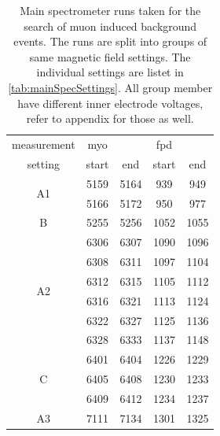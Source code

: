   
  
\begin{table}
	\centering
	\begin{tabular}{|c|cc|cc|}
		\hline
		measurement & myo & & fpd & \\
		setting& start & end & start & end\\
		\hline
		\multirow{2}{*}{A1} & 5159 & 5164 & 939 & 949 \\
		 & 5166 & 5172 & 950 & 977\\
		\hline
		\multirow{1}{*}{B} &5255 & 5256 & 1052 & 1055\\
		\hline
		\multirow{6}{*}{A2}& 6306 & 6307 & 1090 & 1096\\
		& 6308 & 6311 & 1097 & 1104\\
		& 6312 & 6315 & 1105 & 1112\\
		& 6316 & 6321 & 1113 & 1124\\
		& 6322 & 6327 & 1125 & 1136\\
		& 6328 & 6333 & 1137 & 1148\\
		\hline
		
		\multirow{3}{*}{C}& 6401 & 6404 & 1226 & 1229\\
		& 6405 & 6408 & 1230 & 1233\\
		& 6409 & 6412 & 1234 & 1237\\
		\hline
		
		
		
		A3& 7111 & 7134 & 1301 & 1325\\
		\hline
	\end{tabular}
	\caption[Main spectrometer runs]{Main spectrometer runs taken for the search of muon induced background events. The runs are split into groups of same magnetic field settings. The individual settings are listet in \ref{tab:mainSpecSettings}. All group member have different inner electrode voltages, refer to appendix for those as well.}
	\label{tab:mainSpecRuns}
\end{table}

